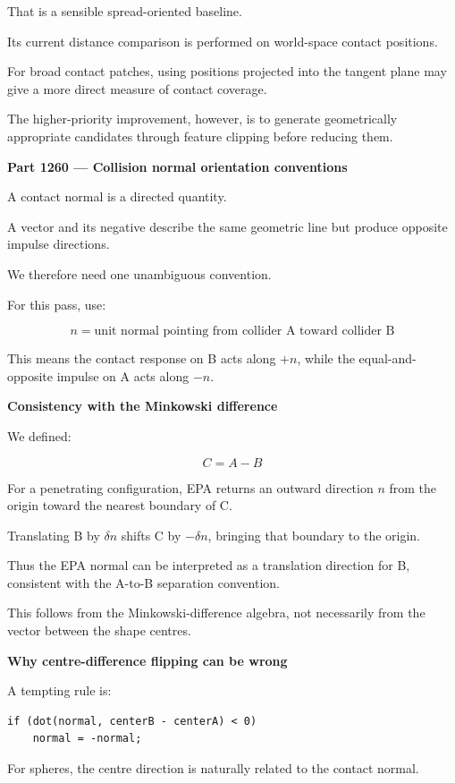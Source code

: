 That is a sensible spread-oriented baseline.

Its current distance comparison is performed on world-space contact positions.

For broad contact patches, using positions projected into the tangent plane may give a more direct measure of contact coverage.

The higher-priority improvement, however, is to generate geometrically appropriate candidates through feature clipping before reducing them.

\textbf{Part 1260 --- Collision normal orientation conventions}

A contact normal is a directed quantity.

A vector and its negative describe the same geometric line but produce opposite impulse directions.

We therefore need one unambiguous convention.

For this pass, use:

\[
\boxed{ n=\text{unit normal pointing from collider A toward collider B} }
\]

This means the contact response on B acts along \(+n\), while the equal-and-opposite impulse on A acts along \(-n\).

\textbf{Consistency with the Minkowski difference}

We defined:

\[
C=A-B
\]

For a penetrating configuration, EPA returns an outward direction \(n\) from the origin toward the nearest boundary of C.

Translating B by \(\delta n\) shifts C by \(-\delta n\), bringing that boundary to the origin.

Thus the EPA normal can be interpreted as a translation direction for B, consistent with the A-to-B separation convention.

This follows from the Minkowski-difference algebra, not necessarily from the vector between the shape centres.

\textbf{Why centre-difference flipping can be wrong}

A tempting rule is:

\begin{verbatim}
if (dot(normal, centerB - centerA) < 0)
    normal = -normal;
\end{verbatim}

For spheres, the centre direction is naturally related to the contact normal.

